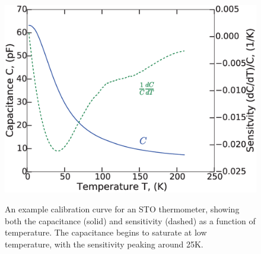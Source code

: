 \documentclass{thesis-umich}
\begin{document}
\begin{figure} \caption[Example STO thermometer calibration]{An example calibration curve for an STO thermometer,
  showing both the capacitance (solid) and sensitivity (dashed) as a function of
temperature. The capacitance begins to saturate at low temperature, with the
sensitivity peaking around 25K. } \centering
\includegraphics[width=\columnwidth]{figures/cvt_apl.eps}\label{cal_curve}
\end{figure}
\end{document}
